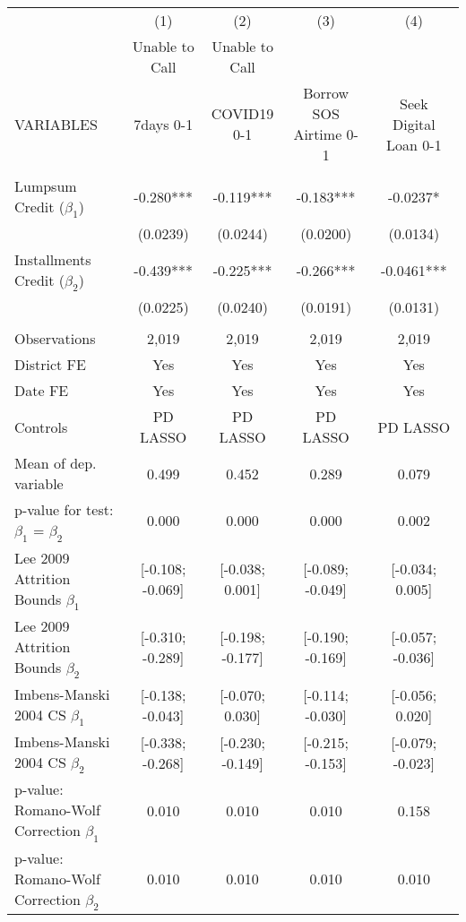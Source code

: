 \begin{tabular}{lcccc} \hline
 & (1) & (2) & (3) & (4) \\
 & Unable to Call & Unable to Call &  &  \\
VARIABLES & 7days 0-1 & COVID19 0-1 & Borrow SOS Airtime 0-1 & Seek Digital Loan 0-1 \\ \hline
 &  &  &  &  \\
Lumpsum Credit ($\beta_1$) & -0.280*** & -0.119*** & -0.183*** & -0.0237* \\
 & (0.0239) & (0.0244) & (0.0200) & (0.0134) \\
Installments Credit ($\beta_2$) & -0.439*** & -0.225*** & -0.266*** & -0.0461*** \\
 & (0.0225) & (0.0240) & (0.0191) & (0.0131) \\
 &  &  &  &  \\
Observations & 2,019 & 2,019 & 2,019 & 2,019 \\
District FE & Yes & Yes & Yes & Yes \\
Date FE & Yes & Yes & Yes & Yes \\
Controls & PD LASSO & PD LASSO & PD LASSO & PD LASSO \\
Mean of dep. variable & 0.499 & 0.452 & 0.289 & 0.079 \\
p-value for test: $\beta_1$ = $\beta_2$ & 0.000 & 0.000 & 0.000 & 0.002 \\
Lee 2009 Attrition Bounds $\beta_1$ & [-0.108; -0.069] & [-0.038; 0.001] & [-0.089; -0.049] & [-0.034; 0.005] \\
Lee 2009 Attrition Bounds $\beta_2$ & [-0.310; -0.289] & [-0.198; -0.177] & [-0.190; -0.169] & [-0.057; -0.036] \\
Imbens-Manski 2004 CS $\beta_1$ & [-0.138; -0.043] & [-0.070; 0.030] & [-0.114; -0.030] & [-0.056; 0.020] \\
Imbens-Manski 2004 CS $\beta_2$ & [-0.338; -0.268] & [-0.230; -0.149] & [-0.215; -0.153] & [-0.079; -0.023] \\
p-value: Romano-Wolf Correction $\beta_1$ & 0.010 & 0.010 & 0.010 & 0.158 \\
 p-value: Romano-Wolf Correction $\beta_2$ & 0.010 & 0.010 & 0.010 & 0.010 \\ \hline
\end{tabular}
